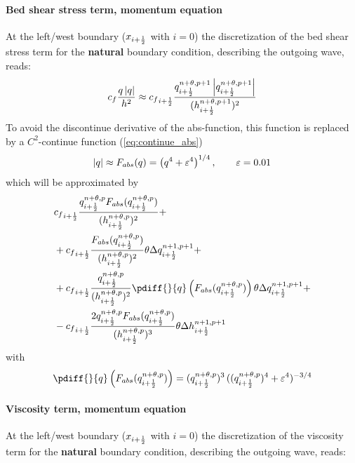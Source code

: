 \paragraph*{Bed shear stress term, momentum equation}
At the left/west boundary ($x_{i+\frac{1}{2}}$ with $i=0$) the discretization of the bed shear stress term for the \textbf{natural} boundary condition, describing the outgoing wave, reads:
\begin{align}
    c_f \frac{q\left| q \right|}{h^2} \approx
    {c_f}_{i+\frac{1}{2}} \frac{q^{n+\theta,p+1}_{i+\frac{1}{2}}\left| q^{n+\theta,p+1}_{i+\frac{1}{2}} \right|}{(h^{n+\theta,p+1}_{i+\frac{1}{2}})^2}
\end{align}
To avoid the discontinue derivative of the abs-function, this function is replaced by a $C^2$-continue function (\autoref{eq:continue_abs})
%
\begin{align}
    \left| q \right| \approx F_{abs}(q) = \left( q^4 + \varepsilon^4 \right)^{1/4}, \qquad \varepsilon = 0.01
\end{align}
which will be approximated by
\begin{align}
    & {c_f}_{i+\half} \frac{q^{n+\theta,p}_{i+\half}\Fabs{q^{n+\theta,p}_{i+\half}}}{(h^{n+\theta,p}_{i+\half})^2}
    +
    \nonumber \\*
    & + {c_f}_{i+\half} \frac{\Fabs{q^{n+\theta,p}_{i+\half}}}{(h^{n+\theta,p}_{i+\half})^2} \theta \Delta q^{n+1,p+1}_{i+\half}
    +
    \nonumber \\*
    & + {c_f}_{i+\half} \frac{q^{n+\theta,p}_{i+\half}}{(h^{n+\theta,p}_{i+\half})^2} \pdiff{}{q}\left(\Fabs{q^{n+\theta,p}_{i+\half}}\right)  \theta \Delta q^{n+1,p+1}_{i+\half}
    +
    \nonumber \\*
    & - {c_f}_{i+\half} \frac{2 q^{n+\theta,p}_{i+\half}\Fabs{q^{n+\theta,p}_{i+\half}}}{(h^{n+\theta,p}_{i+\half})^3} \theta \Delta h^{n+1,p+1}_{i+\half}
\end{align}
with
\begin{align}
    \pdiff{}{q}\left(\Fabs{q^{n+\theta,p}_{i+\half}}\right) =
    (q^{n+\theta, p}_{i+\half})^3\,((q^{n+\theta, p}_{i+\half})^4 + \eps^4)^{-3/4}
\end{align}
\paragraph*{Viscosity term, momentum equation}
At the left/west boundary ($x_{i+\frac{1}{2}}$ with $i=0$) the discretization of the viscosity term for the \textbf{natural} boundary condition, describing the outgoing wave, reads:


